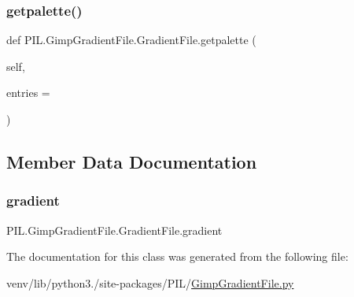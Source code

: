 \subsubsection{\texorpdfstring{getpalette()}{getpalette()}}
{\footnotesize\ttfamily def P\+I\+L.\+Gimp\+Gradient\+File.\+Gradient\+File.\+getpalette (\begin{DoxyParamCaption}\item[{}]{self,  }\item[{}]{entries = {} }\end{DoxyParamCaption})}



\subsection{Member Data Documentation}
\mbox{\label{classPIL_1_1GimpGradientFile_1_1GradientFile_ad10c6a6d81a625f5fe9b04f555654135}} 
\subsubsection{\texorpdfstring{gradient}{gradient}}
{\footnotesize\ttfamily P\+I\+L.\+Gimp\+Gradient\+File.\+Gradient\+File.\+gradient\hspace{0.3cm}{\ttfamily [static]}}



The documentation for this class was generated from the following file\+:\begin{DoxyCompactItemize}
\item 
venv/lib/python3./site-\/packages/\+P\+I\+L/\hyperlink{GimpGradientFile_8py}{Gimp\+Gradient\+File.\+py}\end{DoxyCompactItemize}
